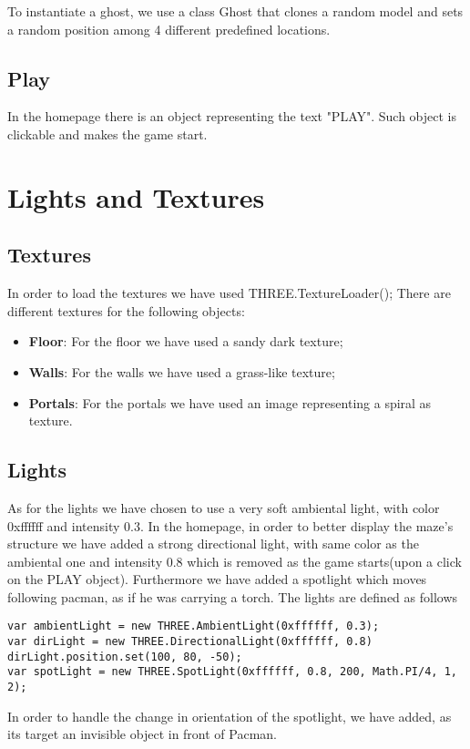 \documentclass[a4paper,oneside]{report}
\begin{document}
To instantiate a ghost, we use a class Ghost that clones a random model and sets a random position among 4 different predefined locations.

\section{Play}
In the homepage there is an object representing the text "PLAY". Such object is clickable and makes the game start. 
\chapter{Lights and Textures}
\section{Textures}
In order to load the textures we have used THREE.TextureLoader();
There are different textures for the following objects:
\begin{itemize}
\item \textbf{Floor}: For the floor we have used a sandy dark texture;
\item \textbf{Walls}: For the walls we have used a grass-like texture;
\item \textbf{Portals}: For the portals we have used an image representing a spiral as texture.
\end{itemize}

\section{Lights}
As for the lights we have chosen to use a very soft ambiental light, with color 0xffffff and intensity 0.3.
In the homepage, in order to better display the maze's structure we have added a strong directional light, with same color as the ambiental one and intensity 0.8 which is removed as the game starts(upon a click on the PLAY object). Furthermore we have added a spotlight which moves following pacman, as if he was carrying a torch.
The lights are defined as follows
\begin{lstlisting}
var ambientLight = new THREE.AmbientLight(0xffffff, 0.3);
var dirLight = new THREE.DirectionalLight(0xffffff, 0.8)
dirLight.position.set(100, 80, -50);
var spotLight = new THREE.SpotLight(0xffffff, 0.8, 200, Math.PI/4, 1, 2);
\end{lstlisting}
In order to handle the change in orientation of the spotlight, we have added, as its target an invisible object in front of Pacman.
\end{document}
